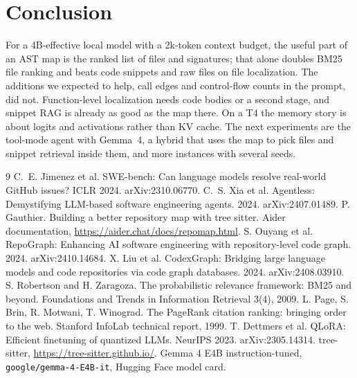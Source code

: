 \documentclass[10pt]{article}
\begin{document}
\section{Conclusion}
For a 4B-effective local model with a 2k-token context budget, the useful part of an AST map is the ranked list of files and signatures; that alone doubles BM25 file ranking and beats code snippets and raw files on file localization. The additions we expected to help, call edges and control-flow counts in the prompt, did not. Function-level localization needs code bodies or a second stage, and snippet RAG is already as good as the map there. On a T4 the memory story is about logits and activations rather than KV cache. The next experiments are the tool-mode agent with Gemma~4, a hybrid that uses the map to pick files and snippet retrieval inside them, and more instances with several seeds.

\begin{thebibliography}{9}\small
{} C.~E. Jimenez et al. SWE-bench: Can language models resolve real-world GitHub issues? ICLR 2024. arXiv:2310.06770.
 C.~S. Xia et al. Agentless: Demystifying LLM-based software engineering agents. 2024. arXiv:2407.01489.
 P. Gauthier. Building a better repository map with tree sitter. Aider documentation, \url{https://aider.chat/docs/repomap.html}.
 S. Ouyang et al. RepoGraph: Enhancing AI software engineering with repository-level code graph. 2024. arXiv:2410.14684.
 X. Liu et al. CodexGraph: Bridging large language models and code repositories via code graph databases. 2024. arXiv:2408.03910.
 S. Robertson and H. Zaragoza. The probabilistic relevance framework: BM25 and beyond. Foundations and Trends in Information Retrieval 3(4), 2009.
 L. Page, S. Brin, R. Motwani, T. Winograd. The PageRank citation ranking: bringing order to the web. Stanford InfoLab technical report, 1999.
 T. Dettmers et al. QLoRA: Efficient finetuning of quantized LLMs. NeurIPS 2023. arXiv:2305.14314.
 tree-sitter, \url{https://tree-sitter.github.io/}.
 Gemma 4 E4B instruction-tuned, \texttt{google/gemma-4-E4B-it}, Hugging Face model card.
\end{thebibliography}
\end{document}
